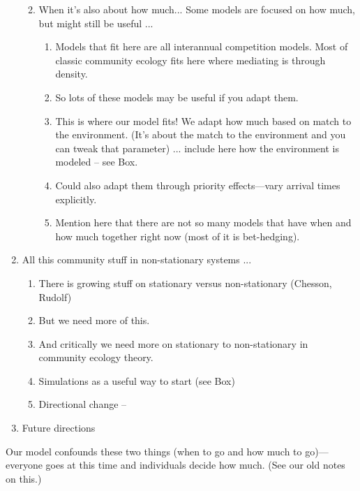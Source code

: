 \documentclass[11pt,letterpaper]{article}
\begin{document}
\begin{enumerate}
\begin{enumerate}
\begin{enumerate}
\end{enumerate}
\item When it's also about how much... Some models are focused on how much, but might still be useful ... 
\begin{enumerate}
\item Models that fit here are all interannual competition models. Most of classic community ecology fits here where mediating is through density.
\item So lots of these models may be useful if you adapt them. 
\item This is where our model fits! We adapt how much based on match to the environment. (It's about the match to the environment and you can tweak that parameter) ... include here how the environment is modeled -- see Box.  
\item Could also adapt them through priority effects---vary arrival times explicitly. 
\item Mention here that there are not so many models that have when and how much together right now (most of it is bet-hedging). 
\end{enumerate}
\end{enumerate}
\item All this community stuff in non-stationary systems ... 
\begin{enumerate}
\item There is growing stuff on stationary versus non-stationary (Chesson, Rudolf)
\item But we need more of this. 
\item And critically we need more on stationary to non-stationary in community ecology theory. 
\item Simulations as a useful way to start (see Box)
\item Directional change -- 
\end{enumerate}
\item Future directions
\end{enumerate}




Our model confounds these two things (when to go and how much to go)---everyone goes at this time and individuals decide how much. (See our old notes on this.)
\end{document}
